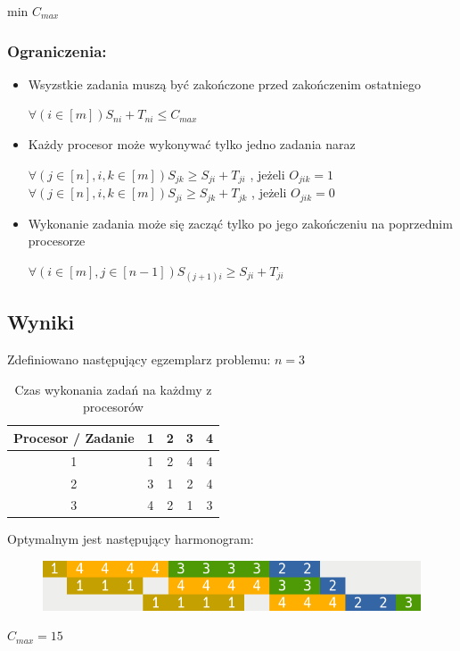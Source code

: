 \documentclass[12pt, a4paper]{article}
\begin{document}
\begin{center}
	min $C_{max}$
\end{center}

\subsubsection*{Ograniczenia:}

\begin{itemize}
    \item Wsyzstkie zadania muszą być zakończone przed zakończenim ostatniego
    \begin{center}
    	$\forall{(i \in [m])} S_{ni} + T_{ni} \leq C_{max}$
    \end{center}

    \item Każdy procesor może wykonywać tylko jedno zadania naraz
        \begin{center}
        	$\forall{(j \in [n], i, k \in [m])} S_{jk} \geq S_{ji} + T_{ji} $
            , jeżeli 
            $ O_{jik} = 1 $
        	$\forall{(j \in [n], i, k \in [m])} S_{ji} \geq S_{jk} + T_{jk} $
        	, jeżeli 
        	$ O_{jik} = 0 $ \\ 
        \end{center}
    \item Wykonanie zadania może się zacząć tylko po jego zakończeniu na poprzednim procesorze
    \begin{center}
    	$\forall{(i \in [m], j \in [n - 1])} S_{(j + 1)i} \geq S_{ji} + T_{ji} $
    \end{center}
    
\end{itemize}

\subsection{Wyniki}

Zdefiniowano następujący egzemplarz problemu: $n = 3$

\begin{table}[H]
\begin{center}
\begin{tabular}{|c|c|c|c|c|}
  \hline
  Procesor / Zadanie & 1 & 2 & 3 & 4 \\
  \hline
  1 & 1 & 2 & 4 & 4 \\
  \hline
  2 & 3 & 1 & 2 & 4 \\
  \hline
  3 & 4 & 2 & 1 & 3 \\
  \hline
\end{tabular} 
\caption{Czas wykonania zadań na każdmy z procesorów}
\end{center}
\end{table}

Optymalnym jest następujący harmonogram:

\begin{figure}[H]
  \begin{center}
  \includegraphics[scale=0.5]{Gantt}
  \end{center}
\end{figure}

$C_{max} = 15$
\end{document}
